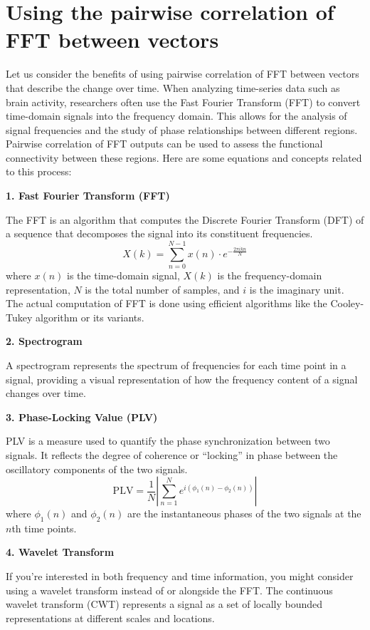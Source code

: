 \documentclass[twocolumn]{article}
\begin{document}
\section{Using the pairwise correlation of FFT between vectors}
Let us consider the benefits of using pairwise correlation of FFT between vectors that describe the change over time. 
When analyzing time-series data such as brain activity, researchers often use the Fast Fourier Transform (FFT) to convert time-domain signals into the frequency domain. This allows for the analysis of signal frequencies and the study of phase relationships between different regions. Pairwise correlation of FFT outputs can be used to assess the functional connectivity between these regions. Here are some equations and concepts related to this process:

\noindent \textbf{1. Fast Fourier Transform (FFT)}

The FFT is an algorithm that computes the Discrete Fourier Transform (DFT) of a sequence that decomposes the signal into its constituent frequencies.
$$X(k) = \sum_{n=0}^{N-1} x(n) \cdot e^{-\frac{2\pi i k n}{N}}$$
where $x(n)$ is the time-domain signal, $X(k)$ is the frequency-domain representation, $N$ is the total number of samples, and $i$ is the imaginary unit.
The actual computation of FFT is done using efficient algorithms like the Cooley-Tukey algorithm or its variants.

\noindent \textbf{2. Spectrogram}

A spectrogram represents the spectrum of frequencies for each time point in a signal, providing a visual representation of how the frequency content of a
signal changes over time.

\noindent \textbf{3. Phase-Locking Value (PLV)}

PLV is a measure used to quantify the phase synchronization between two signals. It reflects the degree of coherence or ``locking'' in phase between the
oscillatory components of the two signals.
$$\mathrm{PLV} = \frac{1}{N} \left| \sum_{n=1}^{N} e^{i(\phi_1(n) - \phi_2(n))} \right|$$
where $\phi_1(n)$ and $\phi_2(n)$ are the instantaneous phases of the two signals at the $n$th time points.

\noindent \textbf{4. Wavelet Transform}

If you're interested in both frequency and time information, you might consider using a wavelet transform instead of or alongside the FFT. The continuous
wavelet transform (CWT) represents a signal as a set of locally bounded representations at different scales and locations.
\end{document}
